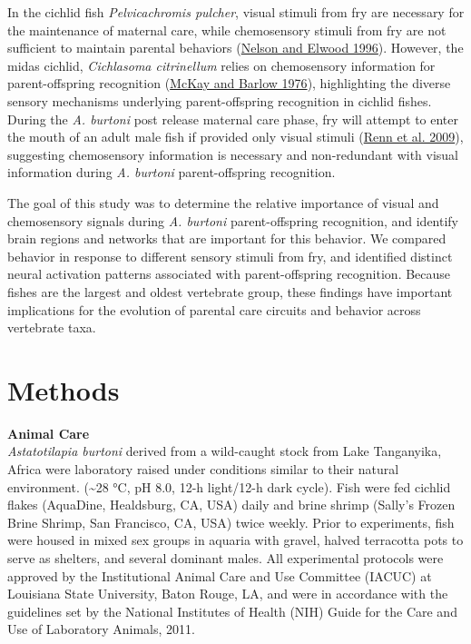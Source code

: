 \documentclass[
  12pt,
]{article}
\begin{document}
In the cichlid fish \emph{Pelvicachromis pulcher}, visual stimuli from fry are necessary for the maintenance of maternal care, while chemosensory stimuli from fry are not sufficient to maintain parental behaviors (\protect\hyperlink{ref-RN28}{Nelson and Elwood 1996}). However, the midas cichlid, \emph{Cichlasoma citrinellum} relies on chemosensory information for parent-offspring recognition (\protect\hyperlink{ref-RN29}{McKay and Barlow 1976}), highlighting the diverse sensory mechanisms underlying parent-offspring recognition in cichlid fishes. During the \emph{A. burtoni} post release maternal care phase, fry will attempt to enter the mouth of an adult male fish if provided only visual stimuli (\protect\hyperlink{ref-RN15}{Renn et al. 2009}), suggesting chemosensory information is necessary and non-redundant with visual information during \emph{A. burtoni} parent-offspring recognition.

The goal of this study was to determine the relative importance of visual and chemosensory signals during \emph{A. burtoni} parent-offspring recognition, and identify brain regions and networks that are important for this behavior. We compared behavior in response to different sensory stimuli from fry, and identified distinct neural activation patterns associated with parent-offspring recognition. Because fishes are the largest and oldest vertebrate group, these findings have important implications for the evolution of parental care circuits and behavior across vertebrate taxa.

\hypertarget{methods}{%
\section{Methods}\label{methods}}

\textbf{Animal Care}\\
\emph{Astatotilapia burtoni} derived from a wild-caught stock from Lake Tanganyika, Africa were laboratory raised under conditions similar to their natural environment. (\textasciitilde28 °C, pH 8.0, 12-h light/12-h dark cycle). Fish were fed cichlid flakes (AquaDine, Healdsburg, CA, USA) daily and brine shrimp (Sally's Frozen Brine Shrimp, San Francisco, CA, USA) twice weekly. Prior to experiments, fish were housed in mixed sex groups in aquaria with gravel, halved terracotta pots to serve as shelters, and several dominant males. All experimental protocols were approved by the Institutional Animal Care and Use Committee (IACUC) at Louisiana State University, Baton Rouge, LA, and were in accordance with the guidelines set by the National Institutes of Health (NIH) Guide for the Care and Use of Laboratory Animals, 2011.
\end{document}
